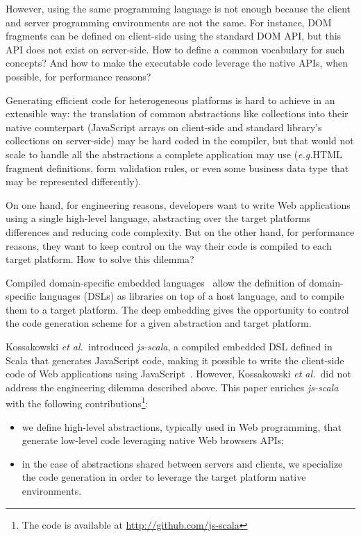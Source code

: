 \documentclass[preprint]{sigplanconf}
\newcommand{\eg}{\emph{e.g.}}
\newcommand{\etal}{\emph{et al.~}}
\begin{document}
However, using the same programming language is not enough because the client and server programming environments
are not the same. For instance, DOM fragments can be defined on client-side using the standard DOM API, but this
API does not exist on server-side. How to define a common vocabulary for such concepts? And how to make the
executable code leverage the native APIs, when possible, for performance reasons?

Generating efficient code for heterogeneous platforms is hard to achieve in an extensible way: the translation of
common abstractions like collections into their native counterpart (JavaScript arrays on client-side and standard
library's collections on server-side) may be hard coded in the compiler, but that would not scale to handle all the
abstractions a complete application may use (\eg HTML fragment definitions, form validation rules, or even some
business data type that may be represented differently).

On one hand, for engineering reasons, developers want to write Web applications using a single high-level language,
abstracting over the target platforms differences and reducing code complexity. But on the other hand, for
performance reasons, they want to keep control on the way their code is compiled to each target platform. How to
solve this dilemma?

Compiled domain-specific embedded languages~\cite{Elliott2003_Compiling} allow the definition of domain-specific
languages (DSLs) as libraries on top of a host language, and to compile them to a target platform. The deep embedding
gives the opportunity to control the code generation scheme for a given abstraction and target platform.

Kossakowski \etal introduced \emph{js-scala}, a compiled embedded DSL defined in Scala that generates JavaScript
code, making it possible to write the client-side code of Web applications using
JavaScript~\cite{Kossakowski12_JsDESL}. However, Kossakowski \etal did not address the engineering dilemma described
above. This paper enriches \emph{js-scala} with the following contributions\footnote{The code is available at
\href{http://github.com/js-scala}{http://github.com/js-scala}}:

\begin{itemize}
 \item we define high-level abstractions, typically used in Web programming, that generate low-level code leveraging
native Web browsers APIs;
 \item in the case of abstractions shared between servers and clients, we specialize the code generation in order to
leverage the target platform native environments.
\end{itemize}
\end{document}
